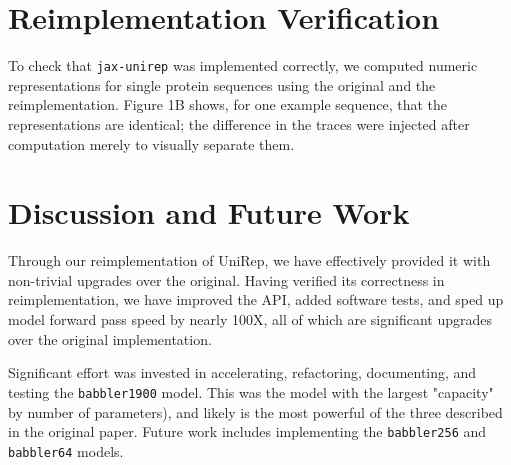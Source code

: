 \documentclass[twoside,11pt]{article}
\begin{document}
\section{Reimplementation Verification}

To check that \verb|jax-unirep| was implemented correctly,
we computed numeric representations for single protein sequences
using the original and the reimplementation.
Figure 1B\vphantom{\ref{fig:01}} shows, for one example sequence,
that the representations are identical;
the difference in the traces were injected after computation
merely to visually separate them.

\section{Discussion and Future Work}

Through our reimplementation of UniRep,
we have effectively provided it with non-trivial upgrades over the original.
Having verified its correctness in reimplementation,
we have improved the API, added software tests,
and sped up model forward pass speed by nearly 100X,
all of which are significant upgrades over the original implementation.

Significant effort was invested in accelerating, refactoring, documenting,
and testing the \verb|babbler1900| model.
This was the model with the largest "capacity" by number of parameters),
and likely is the most powerful of the three described in the original paper.
Future work includes implementing
the \verb|babbler256| and \verb|babbler64| models.


\vskip 0.2in

\end{document}
